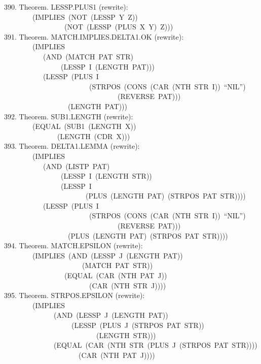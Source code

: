 \documentclass[10pt]{book}
\newenvironment{pubasis}{\begin{flushleft}}{\end{flushleft}}
\begin{document}
\begin{pubasis}
390.    Theorem.  LESSP.PLUS1 (rewrite):\\
~~~~~~~~(IMPLIES~(NOT~(LESSP~Y~Z))\\
~~~~~~~~~~~~~~~~~(NOT~(LESSP~(PLUS~X~Y)~Z)))\\

391.    Theorem.  MATCH.IMPLIES.DELTA1.OK (rewrite):\\
~~~~~~~~(IMPLIES\\
~~~~~~~~~~~(AND~(MATCH~PAT~STR)\\
~~~~~~~~~~~~~~~~(LESSP~I~(LENGTH~PAT)))\\
~~~~~~~~~~~(LESSP~(PLUS~I\\
~~~~~~~~~~~~~~~~~~~~~~~~(STRPOS~(CONS~(CAR~(NTH~STR~I))~``NIL'')\\
~~~~~~~~~~~~~~~~~~~~~~~~~~~~~~~~(REVERSE~PAT)))\\
~~~~~~~~~~~~~~~~~~(LENGTH~PAT)))\\

392.    Theorem.  SUB1.LENGTH (rewrite):\\
~~~~~~~~(EQUAL~(SUB1~(LENGTH~X))\\
~~~~~~~~~~~~~~~(LENGTH~(CDR~X)))\\

393.    Theorem.  DELTA1.LEMMA (rewrite):\\
~~~~~~~~(IMPLIES\\
~~~~~~~~~~~(AND~(LISTP~PAT)\\
~~~~~~~~~~~~~~~~(LESSP~I~(LENGTH~STR))\\
~~~~~~~~~~~~~~~~(LESSP~I\\
~~~~~~~~~~~~~~~~~~~~~~~(PLUS~(LENGTH~PAT)~(STRPOS~PAT~STR))))\\
~~~~~~~~~~~(LESSP~(PLUS~I\\
~~~~~~~~~~~~~~~~~~~~~~~~(STRPOS~(CONS~(CAR~(NTH~STR~I))~``NIL'')\\
~~~~~~~~~~~~~~~~~~~~~~~~~~~~~~~~(REVERSE~PAT)))\\
~~~~~~~~~~~~~~~~~~(PLUS~(LENGTH~PAT)~(STRPOS~PAT~STR))))\\

394.    Theorem.  MATCH.EPSILON (rewrite):\\
~~~~~~~~(IMPLIES~(AND~(LESSP~J~(LENGTH~PAT))\\
~~~~~~~~~~~~~~~~~~~~~~(MATCH~PAT~STR))\\
~~~~~~~~~~~~~~~~~(EQUAL~(CAR~(NTH~PAT~J))\\
~~~~~~~~~~~~~~~~~~~~~~~~(CAR~(NTH~STR~J))))\\

395.    Theorem.  STRPOS.EPSILON (rewrite):\\
~~~~~~~~(IMPLIES\\
~~~~~~~~~~~~~~(AND~(LESSP~J~(LENGTH~PAT))\\
~~~~~~~~~~~~~~~~~~~(LESSP~(PLUS~J~(STRPOS~PAT~STR))\\
~~~~~~~~~~~~~~~~~~~~~~~~~~(LENGTH~STR)))\\
~~~~~~~~~~~~~~(EQUAL~(CAR~(NTH~STR~(PLUS~J~(STRPOS~PAT~STR))))\\
~~~~~~~~~~~~~~~~~~~~~(CAR~(NTH~PAT~J))))\\


\end{pubasis}
\end{document}
